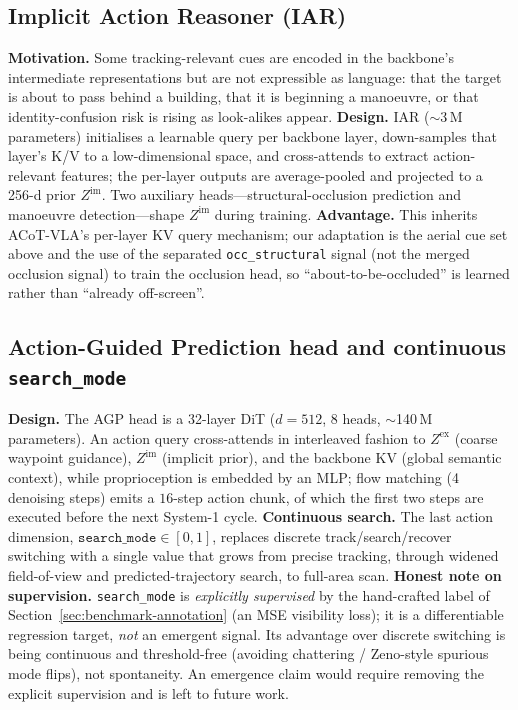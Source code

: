 \documentclass[11pt]{article}
\newcommand{\iar}{IAR}
\newcommand{\agp}{AGP}
\newcommand{\zex}{Z^{\mathrm{ex}}}
\newcommand{\zim}{Z^{\mathrm{im}}}
\begin{document}
\subsection{Implicit Action Reasoner (\iar{})}
\label{sec:method-iar}
\textbf{Motivation.} Some tracking-relevant cues are encoded in the
backbone's intermediate representations but are not expressible as language:
that the target is about to pass behind a building, that it is beginning a
manoeuvre, or that identity-confusion risk is rising as look-alikes appear.
\textbf{Design.} \iar{} ($\sim$3\,M parameters) initialises a learnable
query per backbone layer, down-samples that layer's K/V to a low-dimensional
space, and cross-attends to extract action-relevant features; the per-layer
outputs are average-pooled and projected to a 256-d prior $\zim$. Two
auxiliary heads---structural-occlusion prediction and manoeuvre
detection---shape $\zim$ during training.
\textbf{Advantage.} This inherits ACoT-VLA's per-layer KV query mechanism;
our adaptation is the aerial cue set above and the use of the separated
\texttt{occ\_structural} signal (not the merged occlusion signal) to train
the occlusion head, so ``about-to-be-occluded'' is learned rather than
``already off-screen''.

\subsection{Action-Guided Prediction head and continuous \texttt{search\_mode}}
\label{sec:method-agp}
\textbf{Design.} The \agp{} head is a 32-layer DiT ($d{=}512$, 8 heads,
$\sim$140\,M parameters). An action query cross-attends in interleaved
fashion to $\zex$ (coarse waypoint guidance), $\zim$ (implicit prior), and the
backbone KV (global semantic context), while proprioception is embedded by an
MLP; flow matching (4 denoising steps) emits a $16$-step action chunk, of
which the first two steps are executed before the next System-1 cycle.
\textbf{Continuous search.} The last action dimension,
$\texttt{search\_mode}\in[0,1]$, replaces discrete track/search/recover
switching with a single value that grows from precise tracking, through
widened field-of-view and predicted-trajectory search, to full-area scan.
\textbf{Honest note on supervision.} \texttt{search\_mode} is
\emph{explicitly supervised} by the hand-crafted label of
Section~\ref{sec:benchmark-annotation} (an MSE visibility loss); it is a
differentiable regression target, \emph{not} an emergent signal. Its
advantage over discrete switching is being continuous and threshold-free
(avoiding chattering / Zeno-style spurious mode flips), not spontaneity. An
emergence claim would require removing the explicit supervision and is left
to future work.
\end{document}
